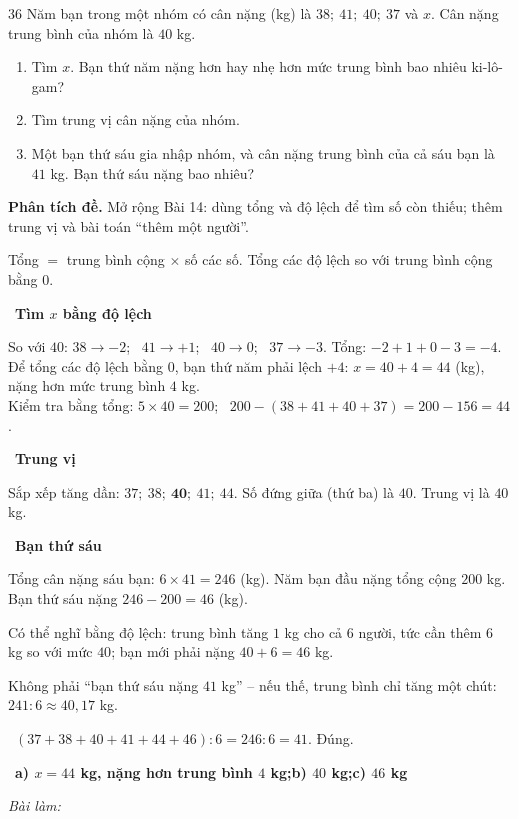 \documentclass[11pt]{article}
\newif\ifsol \solfalse
\providecommand{\AnsWord}{Đáp số}
\newcommand{\ans}[1]{\par\smallskip{\bfseries\color{tmGreen!88!black}\AnsWord:}\ {\bfseries\color{AnsRed}#1}\par}
\newcommand{\probsol}[1]{%
  \begin{lrbox}{\solmeasure}\begin{minipage}{\dimexpr\linewidth-24pt\relax}#1\end{minipage}\end{lrbox}%
  \ifsol
    \begin{solbox}#1\end{solbox}%
  \else
    \setlength{\solht}{\dimexpr\ht\solmeasure+\dp\solmeasure+0.85cm\relax}%
    \ifdim\solht<1.35cm\setlength{\solht}{1.35cm}\fi
    \ifdim\solht>\StudentMaxWork\setlength{\solht}{\StudentMaxWork}\fi
    \begin{tcolorbox}[colback=white,colframe=Line,boxrule=0.8pt,arc=5pt,
      left=8pt,right=8pt,top=4pt,bottom=4pt,height=\solht]{\footnotesize\color{Slate}\itshape\WorkWord}\end{tcolorbox}%
  \fi}
\newlength{\StudentMaxWork}\setlength{\StudentMaxWork}{7.5cm}
\newcommand{\step}[2]{\par\smallskip\noindent{\bfseries\color{tmBlue!85!black}\StepWord~#1.}\ {\bfseries #2}\par\nopagebreak}
\newcommand{\verify}[1]{\par\smallskip\noindent{\bfseries\color{tmGreen!80!black}\faCheckCircle\ \CheckWord}\ #1\par}
\def\WorkWord{Bài làm:}
\def\AnsWord{Đáp số}
\def\StepWord{Bước}
\def\CheckWord{Thử lại:}
\begin{document}
\begin{probbox}{36}{\relax}
Năm bạn trong một nhóm có cân nặng (kg) là $38;\ 41;\ 40;\ 37$ và $x$. Cân nặng trung bình của nhóm là $40$ kg.
\begin{enumerate}[label=\alph*),leftmargin=1.6em,itemsep=0pt,topsep=2pt]
  \item Tìm $x$. Bạn thứ năm nặng hơn hay nhẹ hơn mức trung bình bao nhiêu ki-lô-gam?
  \item Tìm trung vị cân nặng của nhóm.
  \item Một bạn thứ sáu gia nhập nhóm, và cân nặng trung bình của cả sáu bạn là $41$ kg. Bạn thứ sáu nặng bao nhiêu?
\end{enumerate}
\end{probbox}
\probsol{
\textbf{Phân tích đề.} Mở rộng Bài 14: dùng tổng và độ lệch để tìm số còn thiếu; thêm trung vị và bài toán ``thêm một người''.
\begin{recallbox}Tổng $=$ trung bình cộng $\times$ số các số. Tổng các độ lệch so với trung bình cộng bằng $0$.\end{recallbox}
\step{1}{Tìm $x$ bằng độ lệch}
So với $40$: $38 \to -2$; \ $41 \to +1$; \ $40 \to 0$; \ $37 \to -3$. Tổng: $-2 + 1 + 0 - 3 = -4$.\\
Để tổng các độ lệch bằng $0$, bạn thứ năm phải lệch $+4$: $x = 40 + 4 = 44$ (kg), nặng hơn mức trung bình $4$ kg.\\
Kiểm tra bằng tổng: $5\times 40 = 200$; \ $200 - (38 + 41 + 40 + 37) = 200 - 156 = 44$.
\step{2}{Trung vị}
Sắp xếp tăng dần: $37;\ 38;\ \mathbf{40};\ 41;\ 44$. Số đứng giữa (thứ ba) là $40$. Trung vị là $40$ kg.
\step{3}{Bạn thứ sáu}
Tổng cân nặng sáu bạn: $6\times 41 = 246$ (kg). Năm bạn đầu nặng tổng cộng $200$ kg. Bạn thứ sáu nặng $246 - 200 = 46$ (kg).
\begin{tipbox}Có thể nghĩ bằng độ lệch: trung bình tăng $1$ kg cho cả $6$ người, tức cần thêm $6$ kg so với mức $40$;
bạn mới phải nặng $40 + 6 = 46$ kg.\end{tipbox}
\begin{warnbox}Không phải ``bạn thứ sáu nặng $41$ kg'' -- nếu thế, trung bình chỉ tăng một chút: $241 : 6 \approx 40{,}17$ kg.\end{warnbox}
\verify{$(37 + 38 + 40 + 41 + 44 + 46) : 6 = 246 : 6 = 41$. Đúng.}
\ans{a) $x = 44$ kg, nặng hơn trung bình $4$ kg;\quad b) $40$ kg;\quad c) $46$ kg}
}
\end{document}
